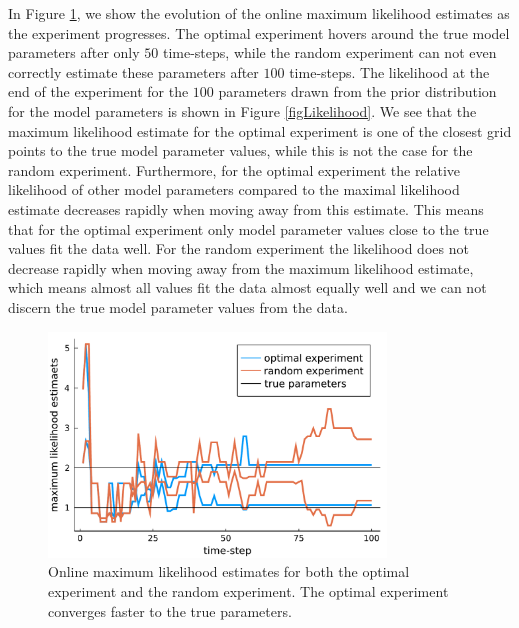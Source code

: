 In Figure \ref{figOnline},  we show the evolution of the online maximum likelihood estimates as the experiment progresses. The optimal experiment hovers around the true model parameters after only $50$ time-steps, while the random experiment can not even correctly estimate these parameters after $100$ time-steps. The likelihood at the end of the experiment for the $100$ parameters drawn from the prior distribution for the model parameters is shown in Figure \ref{figLikelihood}. We see that the maximum likelihood estimate for the optimal experiment is one of the closest grid points to the true model parameter values, while this is not the case for the random experiment. Furthermore, for the optimal experiment the relative likelihood of other model parameters compared to the maximal likelihood estimate decreases rapidly when moving away from this estimate. This means that for the optimal experiment only model parameter values close to the true values fit the data well. For the random experiment the likelihood does not decrease rapidly when moving away from the maximum likelihood estimate, which means almost all values fit the data almost equally well and we can not discern the true model parameter values from the data.
\begin{figure}[H]
	\centering
	\includegraphics[width=0.8\textwidth]{figure/paper 3/online estimate}
	\caption{Online maximum likelihood estimates for both the optimal experiment and the random experiment. The optimal experiment converges faster to the true parameters.}
	\label{figOnline}
\end{figure}
